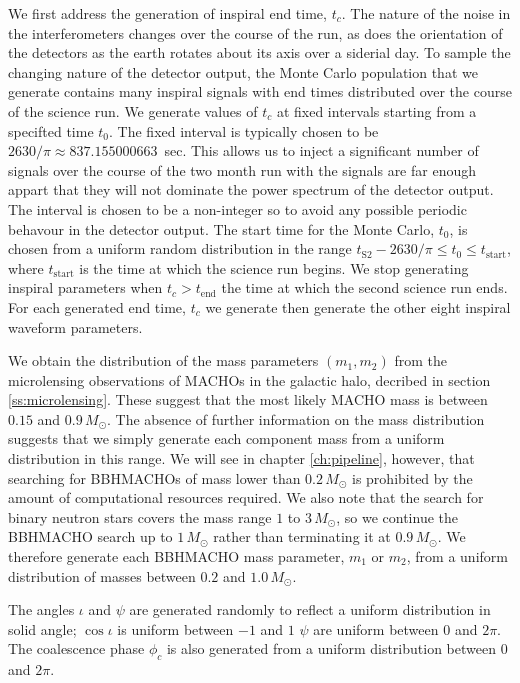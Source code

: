 We first address the generation of inspiral end time, $t_c$. The nature of the
noise in the interferometers changes over the course of the run, as does the
orientation of the detectors as the earth rotates about its axis over a
siderial day. To sample the changing nature of the detector output, the Monte
Carlo population that we generate contains many inspiral signals with end
times distributed over the course of the science run. We generate values of
$t_c$ at fixed intervals starting from a specifted time $t_0$. The fixed
interval is typically chosen to be $2630/\pi \approx 837.155000663$~sec. This
allows us to inject a significant number of signals over the course of the two
month run with the signals are far enough appart that they will not dominate
the power spectrum of the detector output. The interval is chosen to be a
non-integer so to avoid any possible periodic behavour in the detector output.
The start time for the Monte Carlo, $t_0$, is chosen from a uniform random
distribution in the range $t_\mathrm{S2} - 2630/\pi \le t_0 \le
t_\mathrm{start}$, where $t_\mathrm{start}$ is the time at which the science
run begins. We stop generating inspiral parameters when $t_c > t_\mathrm{end}$
the time at which the second science run ends. For each generated end time,
$t_c$ we generate then generate the other eight inspiral waveform parameters.

We obtain the distribution of the mass parameters $(m_1,m_2)$ from the
microlensing observations of MACHOs in the galactic halo, decribed in section
\ref{ss:microlensing}. These suggest that the most likely MACHO mass is between
$0.15$ and $0.9\,M_\odot$. The absence of further information on the mass
distribution suggests that we simply generate each component mass from a
uniform distribution in this range. We will see in chapter \ref{ch:pipeline},
however, that searching for BBHMACHOs of mass lower than $0.2\,M_\odot$ is
prohibited by the amount of computational resources required. We also note
that the search for binary neutron stars covers the mass range $1$ to
$3\,M_\odot$, so we continue the BBHMACHO search up to $1\,M_\odot$ rather
than terminating it at $0.9\,M_\odot$. We therefore generate each BBHMACHO
mass parameter, $m_1$ or $m_2$, from a uniform distribution of masses between
$0.2$ and $1.0\,M_\odot$.

The angles $\iota$ and  $\psi$ are generated randomly to reflect a
uniform distribution in solid angle; $\cos \iota$ is uniform between $-1$ and
$1$ $\psi$ are uniform between $0$ and $2\pi$. The coalescence phase $\phi_c$
is also generated from a uniform distribution between $0$ and $2\pi$.

